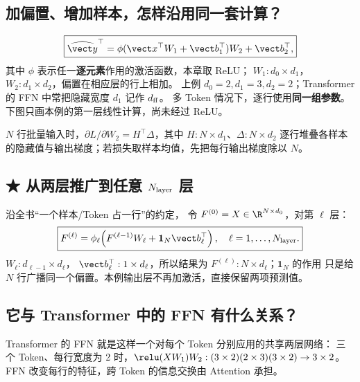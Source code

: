 \subsection{加偏置、增加样本，怎样沿用同一套计算？}
\label{partq:matrices}
\begin{equation}
\boxed{\widehat{\vect y}^\top
=\phi(\vect x^\top W_1+\vect b_1^\top)W_2+\vect b_2^\top,}
\label{eq:mlp-standard}
\end{equation}
其中 $\phi$ 表示任一\textbf{逐元素}作用的激活函数，本章取 ReLU；
$W_1:d_0\times d_1$，$W_2:d_1\times d_2$，偏置在相应层的行上相加。
上例 $d_0=2,d_1=3,d_2=2$；Transformer 的 FFN 中常把隐藏宽度 $d_1$ 记作 $d_{\rm ff}$。
多 Token 情况下，逐行使用\textbf{同一组参数}。下图只画本例的第一层线性计算，尚未经过 ReLU。



$N$ 行批量输入时，$\partial L/\partial W_2=H^\top\Delta$，其中 $H:N\times d_1$、$\Delta:N\times d_2$ 逐行堆叠各样本的隐藏值与输出梯度；若损失取样本均值，先把每行输出梯度除以 $N$。

\subsection{\texorpdfstring{{\symboliconfont ★} 从两层推广到任意 $N_{\rm layer}$ 层}{★ 从两层推广到任意层数}}

沿全书“一个样本/Token 占一行”的约定，
令 $F^{(0)}=X\in\R^{N\times d_0}$，对第 $\ell$ 层：
\begin{equation}
\boxed{F^{(\ell)}
=\phi_\ell\!\left(F^{(\ell-1)}W_\ell+
\mathbf1_N\vect b_\ell^\top\right),\quad \ell=1,\ldots,N_{\rm layer}.}
\label{eq:mlp-l-layer-row}
\end{equation}
$W_\ell:d_{\ell-1}\times d_\ell$，
$\vect b_\ell^\top:1\times d_\ell$，所以结果为
$F^{(\ell)}:N\times d_\ell$；$\mathbf1_N$ 的作用
只是给 $N$ 行广播同一个偏置。本例输出层不再加激活，直接保留两项预测值。

\subsection{它与 Transformer 中的 FFN 有什么关系？}
\label{sec:mlp-ffn}
Transformer 的 FFN 就是这样一个对每个 Token 分别应用的共享两层网络：
三个 Token、每行宽度为 2 时，$\relu(XW_1)W_2:(3\times2)(2\times3)(3\times2)\to3\times2$。
FFN 改变每行的特征，跨 Token 的信息交换由 Attention 承担。

\label{route:mlp-end}
